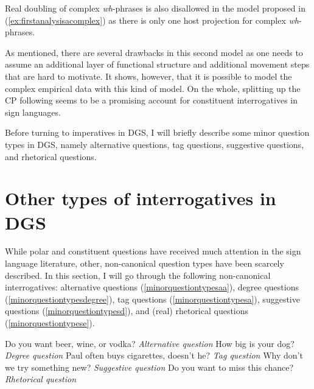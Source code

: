 %
%
%
%
%
%
%
%
%
\noindent Real doubling of complex \textit{wh}-phrases is also disallowed in the model proposed in (\ref{ex:firstanalysisacomplex}) as there is only one host projection for complex \textit{wh}-phrases. 

As mentioned, there are several drawbacks in this second model as one needs to assume an additional layer of functional structure and additional movement steps that are hard to motivate. It shows, however, that it is possible to model the complex empirical data with this kind of model. On the whole, splitting up the CP following \citet{van2010complex, van2012you} seems to be a promising account for constituent interrogatives in sign languages. 

Before turning to imperatives in DGS, I will briefly describe some minor question types in DGS, namely alternative questions, tag questions, suggestive questions, and rhetorical questions. 

\section{Other types of interrogatives in DGS}\label{otherinterr}
While polar and constituent questions have received much attention in the sign language literature, other, non-canonical question types have been scarcely described. In this section, I will go through the following non-canonical interrogatives: alternative questions  (\ref{minorquestiontypesaa}), degree questions (\ref{minorquestiontypesdegree}), tag questions (\ref{minorquestiontypesa}), suggestive questions (\ref{minorquestiontypesd}), and (real) rhetorical questions (\ref{minorquestiontypese}).%

\begin{exe}
\ex\label{minorquestiontypes}\begin{xlist}
\ex Do you want beer, wine, or vodka? \hfill{\textit{Alternative question}} \label{minorquestiontypesaa}
\ex How big is your dog? \hfill{\textit{Degree question}} \label{minorquestiontypesdegree}
\ex Paul often buys cigarettes, doesn't he? \hfill{\textit{Tag question}} \label{minorquestiontypesa}
\ex Why don't we try something new?  \hfill{\textit{Suggestive question}}  \label{minorquestiontypesd}
\ex Do you want to miss this chance? \hfill{\textit{Rhetorical question}} \label{minorquestiontypese}




\end{xlist}
\end{exe} 


